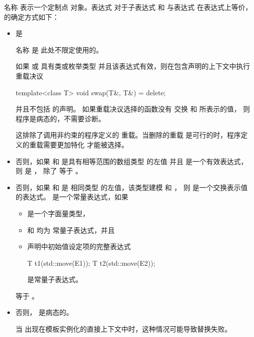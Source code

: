 \pnum
{}%
名称  表示一个定制点
对象。表达式
 对于子表达式 
和  与表达式
 在表达式上等价， 的确定方式如下：

\begin{itemize}
\item
   是 
\begin{footnote}
名称  是
  此处不限定使用的。
\end{footnote}
如果  或 
  具有类或枚举类型 并且该表达式有效，则在包含声明的上下文中执行重载决议
\begin{codeblock}
template<class T>
  void swap(T&, T&) = delete;
\end{codeblock}
  并且不包括  的声明。
  如果重载决议选择的函数没有
  交换  和  所表示的值，
  则程序是病态的，不需要诊断。
  \begin{note}
  这排除了调用非约束的程序定义的  重载。当删除的重载
  是可行的时，程序定义的重载需要更加特化 才能被选择。
  \end{note}

\item
  否则，如果  和 
  是具有相等范围的数组类型 的左值
  并且 
  是一个有效表达式，
  则  是 ，
  除了
   等于
  。

\item
  否则，如果  和  是
  相同类型  的左值，该类型建模  和
  ，
  则  是一个交换表示值的表达式。
   是一个常量表达式，如果
  \begin{itemize}
  \item {} 是一个字面量类型，
  \item {} 和  均为
    常量子表达式，并且
  \item 声明中初始值设定项的完整表达式
\begin{codeblock}
T t1(std::move(E1));
T t2(std::move(E2));
\end{codeblock}
是常量子表达式。
  \end{itemize}
   等于
  。

\item
  否则， 是病态的。
  \begin{note}
  当  出现在模板实例化的直接上下文中时，这种情况可能导致替换失败。
  \end{note}
\end{itemize}

